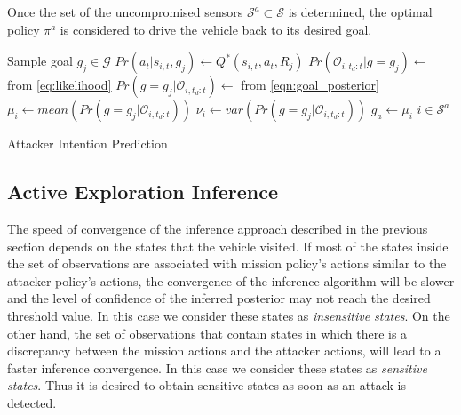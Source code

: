 \documentclass[letterpaper, 10 pt, conference]{ieeeconf}  %
\begin{document}
Once the set of the uncompromised sensors $\mathcal{S}^a \subset \mathcal S$ is determined, the optimal policy $\pi^a$ is considered to drive the vehicle back to its desired goal.

\begin{algorithm}\label{alg:alg1}
    {
        {
            Sample goal $g_j \in \mathcal{G}$\;
            $Pr(a_t|s_{i,t},g_j) \leftarrow Q^*(s_{i,t},a_t,R_j)$\;
            $Pr(\mathcal{O}_{i,t_d:t}|g=g_j) \leftarrow$  from \eqref{eq:likelihood}\;
            $Pr(g=g_j|\mathcal{O}_{i,t_d:t}) \leftarrow$ from \eqref{eqn:goal_posterior}\;
        }
        $\mu_i \leftarrow mean(Pr(g=g_j|\mathcal{O}_{i,t_d:t}))$\;
        $\nu_i \leftarrow  var(Pr(g=g_j|\mathcal{O}_{i,t_d:t}))$\;
        {
            $g_a \leftarrow \mu_i$\;
            $i \in \mathcal{S}^a$\;
        }
    }
    \caption{Attacker Intention Prediction}
\end{algorithm}

\subsection{Active Exploration Inference}\label{sec:approach2}
The speed of convergence of the inference approach described in the previous section depends on the states that the vehicle visited. If most of the states inside the set of observations are associated with mission policy's actions similar to the attacker policy's actions, the convergence of the inference algorithm will be slower and the level of confidence of the inferred posterior may not reach the desired threshold value. In this case we consider these states as {\em insensitive states}. On the other hand, the set of observations that contain states in which there is a discrepancy between the mission actions and the attacker actions, will lead to a faster inference convergence. In this case we consider these states as {\em sensitive states}. Thus it is desired to obtain sensitive states as soon as an attack is detected.
\end{document}
